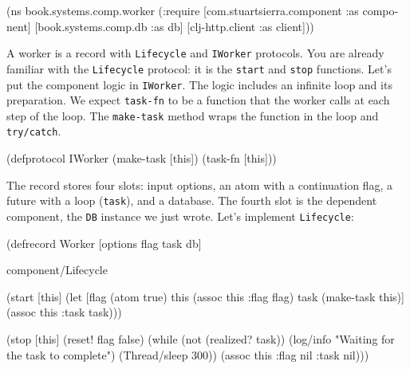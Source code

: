 \else

\begin{english}
  \begin{clojure}
(ns book.systems.comp.worker
  (:require
   [com.stuartsierra.component :as component]
   [book.systems.comp.db :as db]
   [clj-http.client :as client]))
  \end{clojure}
\end{english}

\fi



A worker is a record with \verb|Lifecycle| and \verb|IWorker| protocols. You are already familiar with the \verb|Lifecycle| protocol: it is the \verb|start| and \verb|stop| functions. Let's put the component logic in \verb|IWorker|. The logic includes an infinite loop and its preparation. We expect \verb|task-fn| to be a function that the worker calls at each step of the loop. The \verb|make-task| method wraps the function in the loop and \verb|try/catch|.

\begin{english}
  \begin{clojure}
(defprotocol IWorker
  (make-task [this])
  (task-fn [this]))
  \end{clojure}
\end{english}

The record stores four slots: input options, an atom with a continuation flag, a future with a loop (\verb|task|), and a database. The fourth slot is the dependent component, the \verb|DB| instance we just wrote. Let's implement \verb|Lifecycle|:

\ifnarrow

\begin{english}
  \begin{clojure/lines}
(defrecord Worker
  [options flag task db]

  component/Lifecycle

  (start [this]
    (let [flag (atom true)
          this (assoc this :flag flag)
          task (make-task this)]
      (assoc this :task task)))

  (stop [this]
    (reset! flag false)
    (while (not (realized? task))
      (log/info
        "Waiting for
             the task to complete")
      (Thread/sleep 300))
    (assoc this :flag nil :task nil)))
  \end{clojure/lines}
\end{english}

\else

